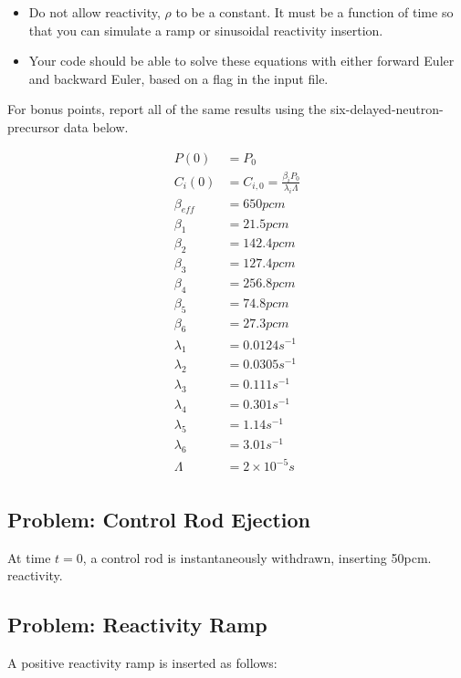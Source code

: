 \documentclass{article}
\begin{document}
\begin{itemize}
        \item Do not allow reactivity, $\rho$ to be a constant. It must be a 
                function of time so that you can simulate a ramp or sinusoidal 
                reactivity insertion.
        \item Your code should be able to solve these equations with either 
                forward Euler and backward Euler, based on a flag in the input 
                file.
\end{itemize}

For bonus points, report all of the same results using
the six-delayed-neutron-precursor data below.

\begin{align*}
        P(0) &=P_0\\
        C_i(0) &= C_{i,0} = \frac{\beta_i P_0}{\lambda_i\Lambda}\\
        \beta_{eff} &= 650pcm\\
        \beta_1 &= 21.5 pcm\\
        \beta_2 &= 142.4 pcm\\
        \beta_3 &= 127.4 pcm\\
        \beta_4 &= 256.8 pcm\\
        \beta_5 &= 74.8 pcm\\
        \beta_6 &= 27.3 pcm\\
        \lambda_1 &= 0.0124 s^{-1}\\
        \lambda_2 &= 0.0305 s^{-1}\\
        \lambda_3 &= 0.111 s^{-1}\\
        \lambda_4 &= 0.301 s^{-1}\\
        \lambda_5 &= 1.14 s^{-1}\\
        \lambda_6 &= 3.01 s^{-1}\\
        \Lambda &= 2\times 10^{-5}s\\
\end{align*}

\subsection{Problem: Control Rod Ejection}


At time $t=0$, a control rod is instantaneously withdrawn, inserting 50pcm.  
reactivity. 

\subsection{Problem: Reactivity Ramp}
A positive reactivity ramp is inserted as follows:
\end{document}
